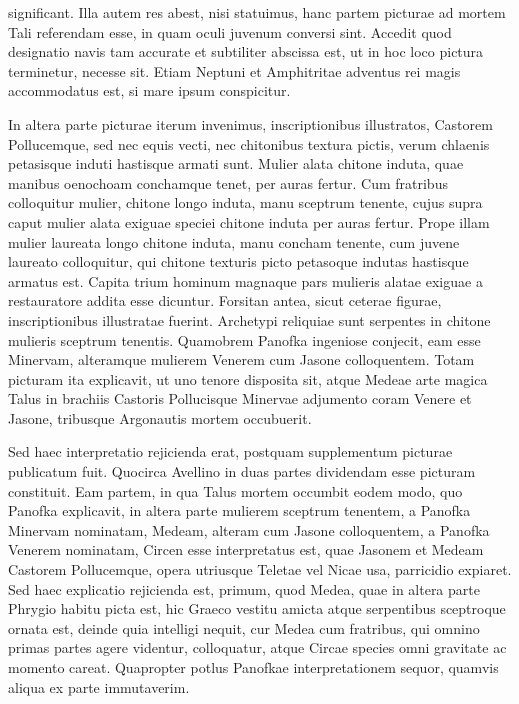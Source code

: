 \documentclass[landscape, a4paper, 11pt, oneside, polutonikogreek, german]{article}
\begin{document}
significant. Illa autem res abest, nisi statuimus, hanc partem picturae ad mortem Tali referendam esse, in quam oculi juvenum conversi sint. Accedit quod designatio navis tam accurate et subtiliter abscissa est, ut in hoc loco pictura terminetur, necesse sit. Etiam Neptuni et Amphitritae adventus rei magis accommodatus est, si mare ipsum conspicitur.

In altera parte picturae iterum invenimus, inscriptionibus illustratos, Castorem Pollucemque, sed nec equis vecti, nec chitonibus textura pictis, verum chlaenis petasisque induti hastisque armati sunt. Mulier alata chitone induta, quae manibus oenochoam conchamque tenet, per auras fertur. Cum fratribus colloquitur mulier, chitone longo induta, manu sceptrum tenente, cujus supra caput mulier alata exiguae speciei chitone induta per auras fertur. Prope illam mulier laureata longo chitone induta, manu concham tenente, cum juvene laureato colloquitur, qui chitone texturis picto petasoque indutas hastisque armatus est. Capita trium hominum magnaque pars mulieris alatae exiguae a restauratore addita esse dicuntur. Forsitan antea, sicut ceterae figurae, inscriptionibus illustratae fuerint. Archetypi reliquiae sunt serpentes in chitone mulieris sceptrum tenentis. Quamobrem Panofka ingeniose conjecit, eam esse Minervam, alteramque mulierem Venerem cum Jasone colloquentem. Totam picturam ita explicavit, ut uno tenore disposita sit, atque Medeae arte magica Talus in brachiis Castoris Pollucisque Minervae adjumento coram Venere et Jasone, tribusque Argonautis mortem occubuerit.

Sed haec interpretatio rejicienda erat, postquam supplementum picturae publicatum fuit. Quocirca Avellino in duas partes dividendam esse picturam constituit. Eam partem, in qua Talus mortem occumbit eodem modo, quo Panofka explicavit, in altera parte mulierem sceptrum tenentem, a Panofka Minervam nominatam, Medeam, alteram cum Jasone colloquentem, a Panofka Venerem nominatam, Circen esse interpretatus est, quae Jasonem et Medeam Castorem Pollucemque, opera utriusque Teletae vel Nicae usa, parricidio expiaret. Sed haec explicatio rejicienda est, primum, quod Medea, quae in altera parte Phrygio habitu picta est, hic Graeco vestitu amicta atque serpentibus sceptroque ornata est, deinde quia intelligi nequit, cur Medea cum fratribus, qui omnino primas partes agere videntur, colloquatur, atque Circae species omni gravitate ac momento careat. Quapropter potlus Panofkae interpretationem sequor, quamvis aliqua ex parte immutaverim.
\end{document}
